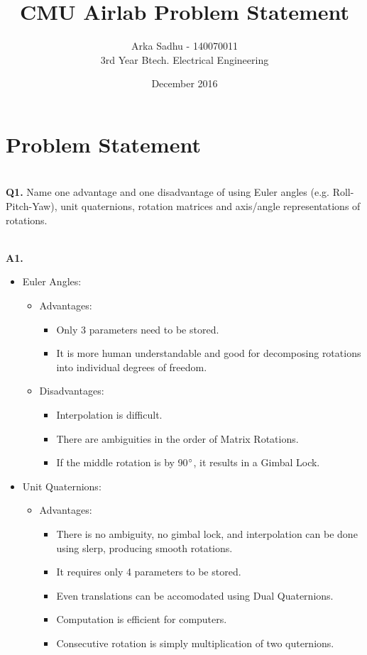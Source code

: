 \documentclass{article}
\title{CMU Airlab Problem Statement}
\author
{
  Arka Sadhu - 140070011\\
  3rd Year Btech. Electrical Engineering
}
\date{December 2016}
\newcommand\Problem[1]{
  \\
  \textbf{Q#1.}
}
\newcommand\Sol[1]{
  \\
  \textbf{A#1.}
  \\
}
\begin{document}
\maketitle

\section*{Problem Statement}
\Problem{1} Name one advantage and one disadvantage of using Euler angles (e.g. Roll-Pitch-Yaw), unit quaternions, rotation matrices and axis/angle representations of rotations.
\Sol{1}
\begin{itemize}
\item Euler Angles:
  \begin{itemize}
  \item Advantages:

    \begin{itemize}
    \item Only 3 parameters need to be stored.
    \item It is more human understandable and good for decomposing rotations into individual degrees of freedom.
    \end{itemize}

  \item Disadvantages:
    \begin{itemize}
    \item Interpolation is difficult.
    \item There are ambiguities in the order of Matrix Rotations.
    \item If the middle rotation is by 90$\degree$, it results in a Gimbal Lock.
    \end{itemize}
  \end{itemize}
  
\item Unit Quaternions:
  \begin{itemize}
  \item Advantages:
    \begin{itemize}
    \item There is no ambiguity, no gimbal lock, and interpolation can be done using slerp, producing smooth rotations.
    \item It requires only 4 parameters to be stored.
    \item Even translations can be accomodated using Dual Quaternions.
    \item Computation is efficient for computers.
    \item Consecutive rotation is simply multiplication of two quternions.
    \end{itemize}


\end{itemize}
\end{itemize}
\end{document}
